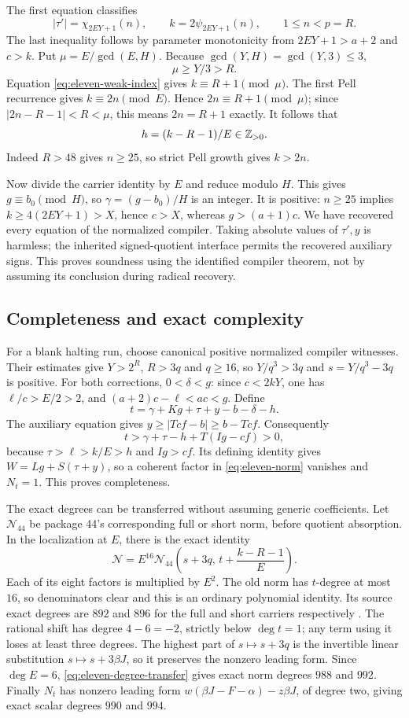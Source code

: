 The first equation classifies
\[
 |\tau'|=\chi_{2EY+1}(n),\qquad
 k=2\psi_{2EY+1}(n),\qquad 1\le n<p=R.
\]
The last inequality follows by parameter monotonicity from
$2EY+1>a+2$ and $c>k$. Put $\mu=E/\gcd(E,H)$. Because
$\gcd(Y,H)=\gcd(Y,3)\le3$,
\[
 \mu\ge Y/3>R.
\]
Equation \eqref{eq:eleven-weak-index} gives $k\equiv R+1\pmod\mu$.
The first Pell recurrence gives $k\equiv2n\pmod E$. Hence
$2n\equiv R+1\pmod\mu$; since $|2n-R-1|<R<\mu$, this means
$2n=R+1$ exactly. It follows that
\[
 h=(k-R-1)/E\in\mathbb Z_{>0}.
\]
Indeed $R>48$ gives $n\ge25$, so strict Pell growth gives $k>2n$.

Now divide the carrier identity by $E$ and reduce modulo $H$. This
gives $g\equiv b_0\pmod H$, so $\gamma=(g-b_0)/H$ is an integer.
It is positive: $n\ge25$ implies $k\ge4(2EY+1)>X$, hence $c>X$,
whereas $g>(a+1)c$. We have recovered every equation of the normalized
compiler. Taking absolute values of $\tau',y$ is harmless; the
inherited signed-quotient interface permits the recovered auxiliary
signs. This proves soundness using the identified compiler theorem,
not by assuming its conclusion during radical recovery.

\subsection{Completeness and exact complexity}

For a blank halting run, choose canonical positive normalized compiler
witnesses. Their estimates give $Y>2^R$, $R>3q$ and $q\ge16$, so
$Y/q^3>3q$ and $s=Y/q^3-3q$ is positive. For both corrections,
$0<\delta<g$: since $c<2kY$, one has $\ell/c>E/2>2$, and
$(a+2)c-\ell<ac<g$. Define
\[
 t=\gamma+Kg+\tau+y-b-\delta-h.
\]
The auxiliary equation gives $y\ge|Tcf-b|\ge b-Tcf$.
Consequently
\[
 t>\gamma+\tau-h+T(Ig-cf)>0,
\]
because $\tau>\ell>k/E>h$ and $Ig>cf$. Its defining identity gives
$W=Lg+S(\tau+y)$, so a coherent factor in
\eqref{eq:eleven-norm} vanishes and $N_t=1$. This proves completeness.

The exact degrees can be transferred without assuming generic
coefficients. Let $\mathcal N_{44}$ be package 44's corresponding
full or short norm, before quotient absorption. In the localization at
$E$, there is the exact identity
\begin{equation}\label{eq:eleven-degree-transfer}
 \mathcal N=
 E^{16}\mathcal N_{44}\left(s+3q,\,
                      t+\frac{k-R-1}{E}\right).
\end{equation}
Each of its eight factors is multiplied by $E^2$. The old norm has
$t$-degree at most $16$, so denominators clear and this is an ordinary
polynomial identity. Its source exact degrees are $892$ and $896$
for the full and short carriers respectively \cite{package44}.
The rational shift has degree $4-6=-2$, strictly below $\deg t=1$;
any term using it loses at least three degrees. The highest part of
$s\mapsto s+3q$ is the invertible linear substitution
$s\mapsto s+3\beta J$, so it preserves the nonzero leading form.
Since $\deg E=6$, \eqref{eq:eleven-degree-transfer} gives exact
norm degrees $988$ and $992$. Finally $N_t$ has nonzero leading form
$w(\beta J-F-\alpha)-z\beta J$, of degree two, giving exact scalar
degrees $990$ and $994$.


